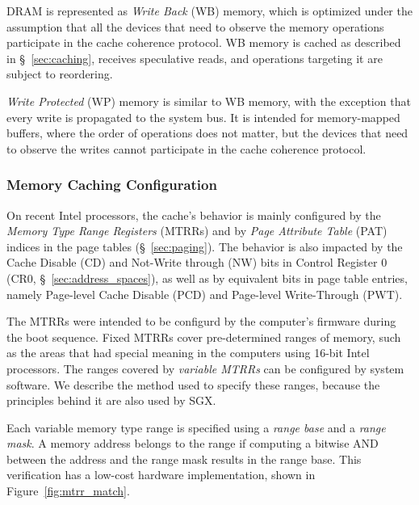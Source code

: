 DRAM is represented as \textit{Write Back} (WB) memory, which is optimized
under the assumption that all the devices that need to observe the memory
operations participate in the cache coherence protocol. WB memory is cached as
described in \S~\ref{sec:caching}, receives speculative reads, and operations
targeting it are subject to reordering.

\textit{Write Protected} (WP) memory is similar to WB memory, with the
exception that every write is propagated to the system bus. It is intended for
memory-mapped buffers, where the order of operations does not matter, but the
devices that need to observe the writes cannot participate in the cache
coherence protocol.


\subsubsection{Memory Caching Configuration}
\label{sec:cacheability_config}


On recent Intel processors, the cache's behavior is mainly configured by the
\textit{Memory Type Range Registers} (MTRRs) and by
\textit{Page Attribute Table} (PAT) indices in the page tables
(\S~\ref{sec:paging}). The behavior is also impacted by the Cache Disable (CD)
and Not-Write through (NW) bits in Control Register 0
(CR0, \S~\ref{sec:address_spaces}), as well as by equivalent bits in page table
entries, namely Page-level Cache Disable (PCD) and Page-level Write-Through
(PWT).

The MTRRs were intended to be configurd by the computer's firmware during the
boot sequence. Fixed MTRRs cover pre-determined ranges of memory, such as the
areas that had special meaning in the computers using 16-bit Intel processors.
The ranges covered by \textit{variable MTRRs} can be configured by system
software. We describe the method used to specify these ranges, because the
principles behind it are also used by SGX.


Each variable memory type range is specified using a \textit{range base} and a
\textit{range mask}. A memory address belongs to the range if computing a
bitwise AND between the address and the range mask results in the range base.
This verification has a low-cost hardware implementation, shown in
Figure~\ref{fig:mtrr_match}.


